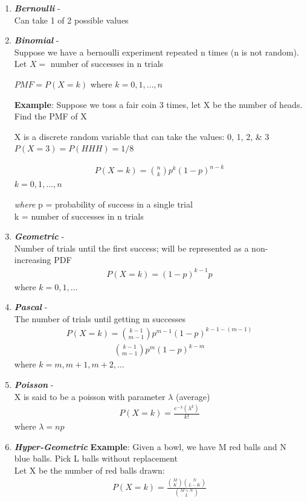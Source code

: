 \documentclass[12pt]{article}
\begin{document}
    \begin{enumerate}[label = \Roman*]
        \item \textit{\textbf{Bernoulli}} -\\
        Can take 1 of 2 possible values
        \item \textit{\textbf{Binomial}} - \\
        Suppose we have a bernoulli experiment repeated n times (n is
        not random). Let $X=$ number of successes in n trials
        \begin{center}
            $PMF = P(X=k)$ where $k=0,1,\dots,n$
        \end{center}
        \textbf{Example}: Suppose we toss a fair coin 3 times, let X be 
        the number of heads. Find the PMF of X 
        \begin{center}
            X is a discrete random variable that can take the values: 0, 1,
            2, \& 3
            $P(X=3) = P(HHH) = 1/8$
        \end{center}
        \begin{align}
            P(X=k) = \binom{n}{k}p^k(1-p)^{n-k}
        \end{align}
        $k=0,1,\dots,n$

        \textit{where} 
        p = probability of success in a single trial\\
        k = number of successes in n trials
        \item \textit{\textbf{Geometric}} -\\
        Number of trials until the first success; will be represented
        as a non-increasing PDF
        \begin{align}
            P(X=k) = (1-p)^{k-1}p
        \end{align}
        where $k=0,1,\dots$
        \item \textit{\textbf{Pascal}} -\\
        The number of trials until getting m successes
        \begin{align*}
            P(X=k) = \binom{k-1}{m-1}p^{m-1}(1-p)^{k-1-(m-1)} 
        \end{align*}
        \begin{align}
            \binom{k-1}{m-1}p^m(1-p)^{k-m} 
        \end{align}
        where $k = m, m+1, m+2, \dots$
        \item \textit{\textbf{Poisson}} -\\
        X is said to be a poisson with parameter $\lambda$ (average)
        \begin{align}
            P(X=k) = \frac{e^{-\lambda}(\lambda^k)}{k!}
        \end{align}
        where $\lambda = np$
        \item \textit{\textbf{Hyper-Geometric}}
        \textbf{Example}: Given a bowl, we have M red balls and N blue 
        balls. Pick L balls without replacement\\
        Let X be the number of red balls drawn:
        \begin{align}
            P(X=k) = \frac{\binom{M}{K}\binom{N}{L-K}}{\binom{M+N}
            {L}}
        \end{align}
    \end{enumerate}
\end{document}

